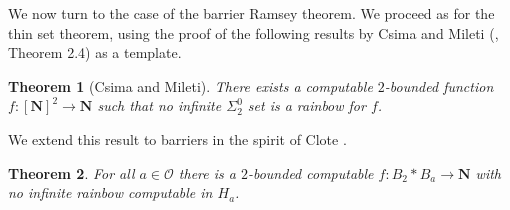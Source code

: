 \documentclass{amsart}
\theoremstyle{plain}
\theoremstyle{plain}
\newtheorem{theorem}{Theorem}
\newcommand\Nat{\mathbf{N}}
\begin{document}
We now turn to the case of the barrier Ramsey theorem. We proceed as for the thin set theorem, using the proof of the following results by Csima and Mileti (\cite{CsimaMileti_2009}, Theorem 2.4) as a template. 

\begin{theorem}[Csima and Mileti]
There exists a computable $2$-bounded function $f:[\Nat]^2 \to \Nat$ such that no infinite $\Sigma^0_2$ set is a rainbow for $f$. 
\end{theorem}

We extend this result to barriers in the spirit of Clote \cite{Clote1984}.

\begin{theorem}\label{lb:rain}
For all $a \in \mathcal{O}$ there is a $2$-bounded computable $f: B_2 * B_a \to \Nat$ with no infinite rainbow
computable in $H_a$. 
\end{theorem}
\end{document}
